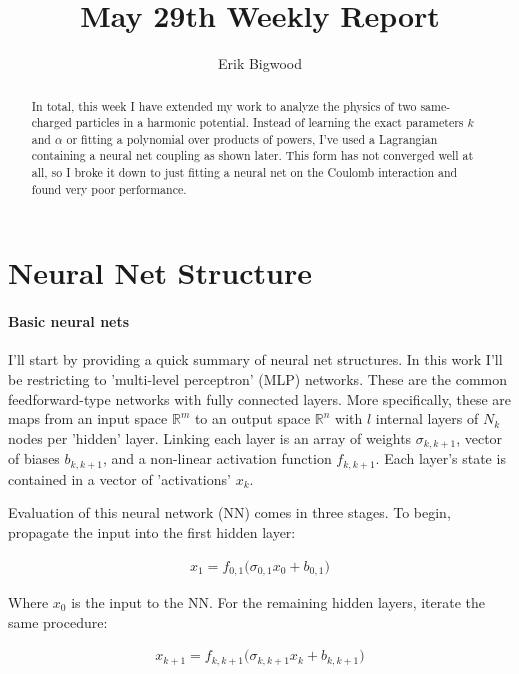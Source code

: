 \documentclass[]{article}
\title{May 29th Weekly Report}
\author{Erik Bigwood}
\begin{document}
\maketitle

\begin{abstract}
In total, this week I have extended my work to analyze the physics of two same-charged particles in a harmonic potential. Instead of learning the exact parameters $k$ and $\alpha$ or fitting a polynomial over products of powers, I've used a Lagrangian containing a neural net coupling as shown later. This form has not converged well at all, so I broke it down to just fitting a neural net on the Coulomb interaction and found very poor performance.
\end{abstract}

\tableofcontents
\newpage

\section{Neural Net Structure}

\paragraph{Basic neural nets}

I'll start by providing a quick summary of neural net structures. In this work I'll be restricting to 'multi-level perceptron' (MLP) networks\cite{Yu2021}. These are the common feedforward-type networks with fully connected layers. More specifically, these are maps from an input space $\mathbb{R}^m$ to an output space $\mathbb{R}^n$ with $l$ internal layers of $N_k$ nodes per 'hidden' layer. Linking each layer is an array of weights $\sigma_{k,k+1}$, vector of biases $b_{k,k+1}$, and a non-linear activation function $f_{k,k+1}$. Each layer's state is contained in a vector of 'activations' $x_k$.

Evaluation of this neural network (NN) comes in three stages. To begin, propagate the input into the first hidden layer:

\begin{eqnarray*}
	x_1 = f_{0,1}\Big( \sigma_{0,1}  x_0 + b_{0,1}\Big)
\end{eqnarray*}

Where $x_0$ is the input to the NN. For the remaining hidden layers, iterate the same procedure:

\begin{eqnarray*}
	x_{k+1} = f_{k,k+1}\Big( \sigma_{k,k+1}  x_k + b_{k,k+1}\Big)
\end{eqnarray*}
\end{document}
